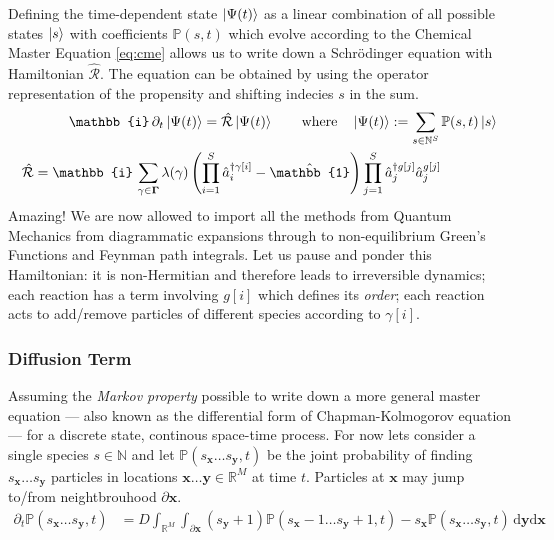 \documentclass{article}[12pt]
\numberwithin{equation}{section}
\begin{document}
Defining the time-dependent state $\ket{\Psi(t)}$ as a linear combination of all possible
states $\ket{s}$ with coefficients $\mathbb{P}(s,t)$ which evolve according to
the Chemical Master Equation \eqref{eq:cme} allows us to write down a Schr\"odinger
equation with Hamiltonian $\hat{\mathcal{R}}$. The equation can be obtained by using
the operator representation of the propensity and shifting indecies $s$ in the sum.
\begin{align}
	\mathbb{i}\,\partial_t\ket{\Psi(t)}
	=\hat{\mathcal{R}}\ket{\Psi(t)}
	\qquad\text{where}\quad
	\ket{\Psi(t)}:=\sum_{s\in\mathbb{N}^S}\mathbb{P}(s,t)\ket{s}
	\label{eq:reactionschrodinger}
\\
	\hat{\mathcal{R}} = \mathbb{i}\,
	\sum_{\gamma\in\mathbf{\Gamma}}
		\lambda(\gamma)
		\left(
			\prod_{i=1}^S\hat{a}_i^{\dagger\gamma[i]}
			-
			\hat{\mathbb{1}}
		\right)
		\prod_{j=1}^S
			\hat{a}_j^{\dagger g[j]}
			\hat{a}_j^{g[j]}
	\qquad\qquad
	\label{eq:reactionhamiltonian}
\end{align}
Amazing! We are now allowed to import all the methods from Quantum Mechanics from
diagrammatic expansions through to non-equilibrium Green's Functions and Feynman
path integrals. Let us pause and ponder this Hamiltonian: it is non-Hermitian and
therefore leads to irreversible dynamics; each reaction has a term involving
$g[i]$ which defines its \textit{order}; each reaction acts to add/remove particles
of different species according to $\gamma[i]$.
\vspace{-10pt}\subsubsection{Diffusion Term}\vspace{-10pt}
Assuming the \textit{Markov property} possible to write down a more general master
equation --- also known as the differential form of Chapman-Kolmogorov equation ---
for a discrete state, continous space-time process. For now lets consider a single
species $s\in\mathbb{N}$ and let $\mathbb{P}(s_{\mathbf{x}}\dots s_{\mathbf{y}},t)$
be the joint probability of finding $s_{\mathbf{x}}\dots s_{\mathbf{y}}$
particles in locations $\mathbf{x}\dots\mathbf{y}\in\mathbb{R}^M$ at time $t$.
Particles at $\mathbf{x}$ may jump to/from neightbrouhood $\partial\mathbf{x}$.
\begin{align}
	\partial_t \mathbb{P}(s_{\mathbf{x}}\dots s_{\mathbf{y}},t) &=
	D\int_{\mathbb{R}^{M}}\int_{\partial\mathbf{x}}\!
	(s_{\mathbf{y}}+1)\mathbb{P}(s_{\mathbf{x}}-1\dots s_{\mathbf{y}}+1,t)
	-
	s_{\mathbf{x}}\mathbb{P}(s_{\mathbf{x}}\dots s_{\mathbf{y}},t)
	\,\mathrm{d}\mathbf{y}\mathrm{d}\mathbf{x}
\end{align}
\end{document}
